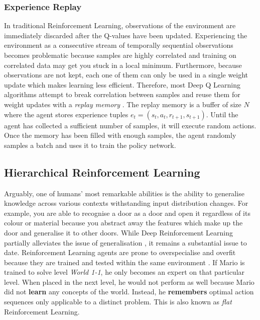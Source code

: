 \documentclass[notitlepage,a4paper,11pt]{article}
\begin{document}
\subsubsection{Experience Replay}
In traditional Reinforcement Learning, observations of the environment are immediately discarded after the Q-values have been updated. Experiencing the environment as a consecutive stream of temporally sequential observations becomes problematic because samples are highly correlated and training on correlated data may get you stuck in a local minimum. Furthermore, because observations are not kept, each one of them can only be used in a single weight update which makes learning less efficient. Therefore, most Deep Q Learning algorithms attempt to break correlation between samples and reuse them for weight updates with a \textit{replay memory} \cite{lin1993reinforcement}. The replay memory is a buffer of size $N$ where the agent stores experience tuples $e_t = (s_t, a_t, r_{t+1}, s_{t+1})$. Until the agent has collected a sufficient number of samples, it will execute random actions. Once the memory has been filled with enough samples, the agent randomly samples a batch and uses it to train the policy network. 


\subsection{Hierarchical Reinforcement Learning}
Arguably, one of humans' most remarkable abilities is the ability to generalise knowledge \cite{geirhos2018generalisation} across various contexts withstanding input distribution changes. For example, you are able to recognise a door as a door and open it regardless of its colour or material because you abstract away the features which make up the door and generalise it to other doors. While Deep Reinforcement Learning partially alleviates the issue of generalisation \cite{sutton1996generalization}, it remains a substantial issue \cite{van2017hybrid} to date. Reinforcement Learning agents are prone to overspecialise and overfit because they are trained and tested within the same environment \cite{cobbe2018quantifying}. If Mario is trained to solve level \textit{World 1-1}, he only becomes an expert on that particular level. When placed in the next level, he would not perform as well because Mario did not \textbf{learn} any concepts of the world. Instead, he \textbf{remembers} optimal action sequences only applicable to a distinct problem. This is also known as \textit{flat} Reinforcement Learning.
\end{document}
